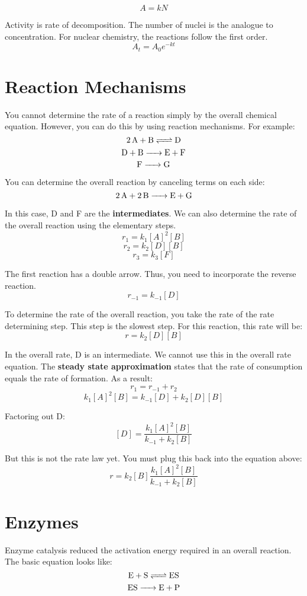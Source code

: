 \documentclass{article}
\begin{document}
$$ A = k N $$

Activity is rate of decomposition. The number of nuclei is the analogue to
concentration. For nuclear chemistry, the reactions follow the first order.
$$ A_{t} = A_{0}e^{-kt} $$

\section{Reaction Mechanisms}

You cannot determine the rate of a reaction simply by the overall chemical
equation. However, you can do this by using reaction mechanisms. For example:
$$\ce{2A + B <=> D}$$
$$ \ce{D + B -> E + F} $$
$$ \ce{F -> G} $$

You can determine the overall reaction by canceling terms on each side:
$$ \ce{2A + 2B -> E + G} $$

In this case, D and F are the \textbf{intermediates}. We can also determine the
rate of the overall reaction using the elementary steps.
$$ r_{1} = k_{1}[A]^{2}[B] $$
$$ r_{2} = k_{2}[D][B] $$
$$ r_{3} = k_{3}[F] $$

The first reaction has a double arrow. Thus, you need to incorporate the reverse
reaction.
$$ r_{-1} = k_{-1}[D] $$

To determine the rate of the overall reaction, you take the rate of the rate
determining step. This step is the slowest step.  For this reaction, this rate
will be:
$$ r = k_{2}[D][B] $$

In the overall rate, D is an intermediate. We cannot use this in the overall
rate equation. The \textbf{steady state approximation} states that the rate of
consumption equals the rate of formation. As a result:
$$ r_{1} = r_{-1} + r_{2} $$
$$ k_{1}[A]^{2}[B] = k_{-1}[D] + k_{2}[ D ][ B ]$$

Factoring out D:
$$ [D] = \frac{ k_{1}[A]^{2}[B] }{ k_{-1} + k_{2}[B] } $$

But this is not the rate law yet. You must plug this back into the equation
above:
$$  r = k_{2}[B] \frac{ k_{1}[A]^{2}[B] }{ k_{-1} + k_{2}[B] } $$

\section{Enzymes}

Enzyme catalysis reduced the activation energy required in an overall reaction.
The basic equation looks like:
$$ \ce{E + S <=> ES } $$
$$ \ce{ES -> E + P} $$
\end{document}
